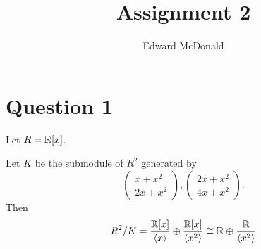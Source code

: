 \documentclass{unswmaths}
\begin{document}
\subject{Modules and Representation Theory}
\author{Edward McDonald}
\title{Assignment 2}


\setlength\parindent{0pt}

\newcommand{\Ft}{{\mathbb{F}_3}}
\newcommand{\isom}{\cong}
\newcommand{\im}{{\operatorname{im}}}


\unswtitle{}
    
\section*{Question 1}
Let $R = \mathbb{R}[x]$.
\begin{lemma}
    Let $K$ be the submodule of $R^2$ generated by
    \begin{equation*}
        \begin{pmatrix}x+x^2\\2x+x^2\end{pmatrix},\begin{pmatrix}2x+x^2\\4x+x^2\end{pmatrix}.
    \end{equation*} 
    Then
    \begin{equation*}
        R^2/K = \frac{\Rl[x]}{\langle x \rangle}\oplus\frac{\Rl[x]}{\langle x^2\rangle}\isom \Rl \oplus \frac{\Rl}{\langle x^2\rangle}
    \end{equation*}
\end{lemma}
\end{document}
